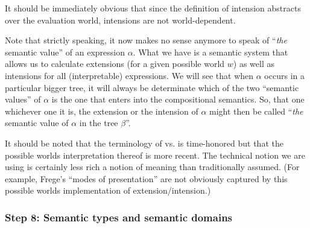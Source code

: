 It should be immediately obvious that since the definition of intension
abstracts over the evaluation world, intensions are not world-dependent.

Note that strictly speaking, it now makes no sense anymore to speak of
``\emph{the} semantic value'' of an expression $\alpha$. What we have is a
semantic system that allows us to calculate extensions (for a given possible
world $w$) as well as intensions for all (interpretable) expressions. We will
see that when $\alpha$ occurs in a particular bigger tree, it will always be
determinate which of the two ``semantic values'' of $\alpha$ is the one that
enters into the compositional semantics. So, that one \dash whichever one it is,
the extension or the intension of $\alpha$ \dash might then be called
``\emph{the} semantic value of $\alpha$ in the tree $\beta$''.

%
It should be noted that the terminology of  vs. 
is time-honored but that the possible worlds interpretation thereof is more
recent. The technical notion we are using is certainly less rich a notion of
meaning than traditionally assumed. (For example, Frege's ``modes of
presentation'' are not obviously captured by this possible worlds implementation
of extension/intension.)

\subsubsection{Step 8: Semantic types and semantic domains}
\label{sec:semantic-types}


